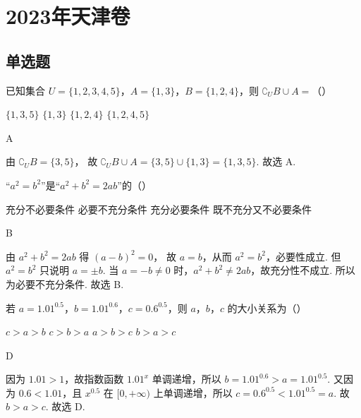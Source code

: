 \chapter{2023年天津卷}

\section{单选题}

\begin{problem}
已知集合 \(U=\{1,2,3,4,5\}\)，\(A=\{1,3\}\)，\(B=\{1,2,4\}\)，则 \(\complement_U B\cup A=\)（\quad）

\choices
    {\(\{1,3,5\}\)}
    {\(\{1,3\}\)}
    {\(\{1,2,4\}\)}
    {\(\{1,2,4,5\}\)}
\end{problem}

\begin{answer}
A
\end{answer}

\begin{solution}
由
\(\complement_U B=\{3,5\}\)，
故
\(\complement_U B\cup A=\{3,5\}\cup \{1,3\}=\{1,3,5\}\).
故选 A.
\end{solution}

\begin{problem}
“\(a^2=b^2\)”是“\(a^2+b^2=2ab\)”的（\quad）

\choices
    {充分不必要条件}
    {必要不充分条件}
    {充分必要条件}
    {既不充分又不必要条件}
\end{problem}

\begin{answer}
B
\end{answer}

\begin{solution}
由
\(a^2+b^2=2ab\)
得
\((a-b)^2=0\)，
故 \(a=b\)，从而 \(a^2=b^2\)，必要性成立.
但 \(a^2=b^2\) 只说明 \(a=\pm b\). 当 \(a=-b\ne 0\) 时，\(a^2+b^2\ne 2ab\)，故充分性不成立. 所以为必要不充分条件. 故选 B.
\end{solution}

\begin{problem}
若 \(a=1.01^{0.5}\)，\(b=1.01^{0.6}\)，\(c=0.6^{0.5}\)，则 \(a\)，\(b\)，\(c\) 的大小关系为（\quad）

\choices
    {\(c>a>b\)}
    {\(c>b>a\)}
    {\(a>b>c\)}
    {\(b>a>c\)}
\end{problem}

\begin{answer}
D
\end{answer}

\begin{solution}
因为 \(1.01>1\)，故指数函数 \(1.01^x\) 单调递增，所以
\(b=1.01^{0.6}>a=1.01^{0.5}\).
又因为 \(0.6<1.01\)，且 \(x^{0.5}\) 在 \([0,+\infty)\) 上单调递增，所以
\(c=0.6^{0.5}<1.01^{0.5}=a\).
故
\(b>a>c\).
故选 D.
\end{solution}

